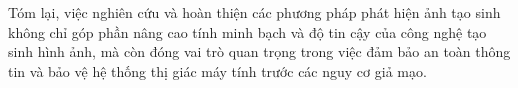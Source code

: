 
Tóm lại, việc nghiên cứu và hoàn thiện các phương pháp phát hiện ảnh tạo sinh không chỉ góp phần nâng cao tính minh bạch và độ tin cậy của công nghệ tạo sinh hình ảnh, mà còn đóng vai trò quan trọng trong việc đảm bảo an toàn thông tin và bảo vệ hệ thống thị giác máy tính trước các nguy cơ giả mạo.

%
%

